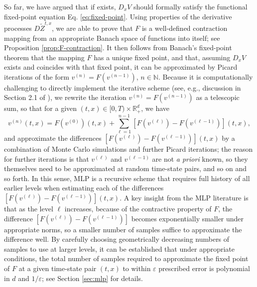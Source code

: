 \documentclass[11pt]{article}
\theoremstyle{definition}
\theoremstyle{plain}
\newcommand{\veps}{\varepsilon}
\begin{document}
So far, we have argued that if exists, $D_x V$ should formally satisfy the functional fixed-point equation Eq. \eqref{eq:fixed-point}. 
Using properties of the derivative processes $D \tilde{Z}^{t,x}$, 
we are able to prove that $F$ is a well-defined contraction mapping from an appropriate Banach space of functions into itself; 
see Proposition \ref{prop:F-contraction}. It then follows from Banach's fixed-point theorem that the mapping $F$ has a unique fixed point, 
and that, assuming $D_x V$ exists and coincides with that fixed point, it can be approximated by 
Picard iterations of the form $v^{(n)} = F(v^{(n-1)})$, $n \in \mathbb{N}$. 
Because it is computationally challenging to directly implement the iterative scheme (see, e.g., discussion in Section 2.1 of \cite{hutzenthaler2019multilevel}), 
we rewrite the iteration $v^{(n)} = F(v^{(n-1)})$ as a telescopic sum, 
so that for a given $(t,x) \in [0,T) \times \mathbb{R}^d_+$, we have
\begin{equation}\label{eq:telescopic-sum}
    v^{(n)}(t,x) = F(v^{(0)})(t,x) + \sum_{\ell=1}^{n-1} \left[F(v^{(\ell)}) - F(v^{(\ell-1)})\right](t,x), 
\end{equation}
and approximate the differences $\left[F(v^{(\ell)}) - F(v^{(\ell-1)})\right](t,x)$ 
by a combination of Monte Carlo simulations and further Picard iterations; 
the reason for further iterations is that $v^{(\ell)}$ and $v^{(\ell-1)}$ are not {\em a priori} known, so they themselves need to be approximated 
at random time-state pairs, and so on and so forth. 
In this sense, MLP is a recursive scheme that requires full history of all earlier levels 
when estimating each of the differences $\left[F(v^{(\ell)}) - F(v^{(\ell-1)})\right](t,x)$. 
A key insight from the MLP literature is that as the level $\ell$ increases, because of the contractive property of $F$, 
the difference $\left[F(v^{(\ell)}) - F(v^{(\ell-1)})\right]$ becomes exponentially smaller under appropriate norms, 
so a smaller number of samples suffice to approximate the difference well. 
By carefully choosing geometrically decreasing numbers of samples to use at larger levels, it can be established that 
under appropriate conditions, the total number of samples required to approximate the fixed point of $F$ at a given time-state pair $(t,x)$
to within $\veps$ prescribed error is polynomial in $d$ and $1/\veps$; see Section \ref{sec:mlp} for details. 
\end{document}
